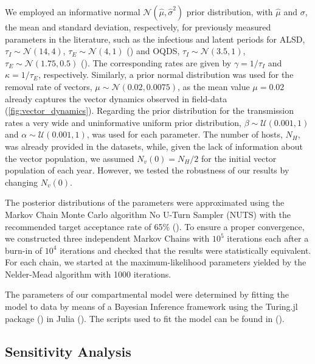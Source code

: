 We employed an informative normal $\mathcal{N}(\hat{\mu},\hat{\sigma}^2)$
prior distribution, with $\hat{\mu}$ and
$\sigma$, the mean and standard deviation, respectively, for previously
measured parameters in the literature, such as the infectious and latent
periods for ALSD, $\tau_I\sim\mathcal{N}(14, 4)$, $\tau_E\sim\mathcal{N}(4, 1)$
(\cite{teviotdale2003almond, Moralejo2020}) and OQDS,
$\tau_I\sim\mathcal{N}(3.5, 1)$, $\tau_E\sim\mathcal{N}(1.75, 0.5)$
(\cite{Fierro2019}). The corresponding rates are given by $\gamma=1/\tau_I$ and
$\kappa=1/\tau_E$, respectively. Similarly, a prior normal distribution was
used for the removal rate of vectors, $\mu\sim\mathcal{N}(0.02, 0.0075)$, as
the mean value $\mu=0.02$ already captures the vector dynamics observed in
field-data (\cref{fig:vector_dynamics}). Regarding the prior distribution for
the transmission rates a very wide and uninformative uniform prior
distribution, $\beta\sim \mathcal{U}(0.001, 1)$ and
$\alpha\sim\mathcal{U}(0.001, 1)$, was used for each parameter. The number of
hosts, $N_H$, was already provided in the datasets, while, given the lack of
information about the vector population, we assumed $N_v(0)=N_H/2$ for the
initial vector population of each year. However, we tested the robustness of
our results by changing $N_v(0)$.

The posterior distributions of the parameters were approximated using the
Markov Chain Monte Carlo algorithm No U-Turn Sampler (NUTS) with the
recommended target acceptance rate of 65\% (\cite{Homan2014}). To ensure a
proper convergence, we constructed three independent Markov Chains with $10^5$
iterations each after a burn-in of $10^4$ iterations and checked that the
results were statistically equivalent. For each chain, we started at the
maximum-likelihood parameters yielded by the Nelder-Mead algorithm with 1000
iterations.

The parameters of our compartmental model were determined by fitting the
model to data by means of a Bayesian Inference framework using the Turing.jl
package (\cite{Turing.jl}) in Julia (\cite{julia}). The scripts used to fit the
model can be found in (\cite{CODE}).

\subsection{Sensitivity Analysis}

